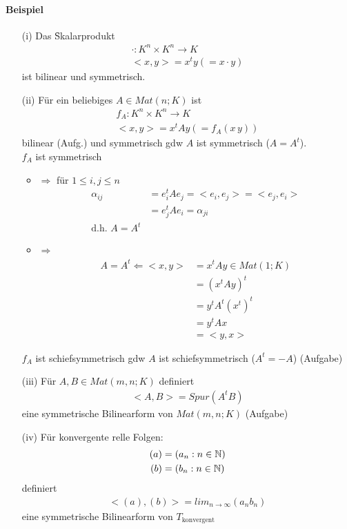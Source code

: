 \paragraph{Beispiel}
\begin{itemize}
\item[(i)] Das \f{Skalarprodukt}
\begin{align}
\cdot : K^{n} \times K^{n} \rightarrow K \\
<x, y> =x^t y (= x \cdot y)
\end{align}
ist bilinear und symmetrisch.

\item[(ii)] Für ein beliebiges $A \in Mat(n; K)$ ist
\begin{align}
f_A: K^n \times K^n \rightarrow K \\
<x, y> = x^t A y (=f_A(x\, y))
\end{align}
bilinear (Aufg.) und symmetrisch gdw $A$ ist symmetrisch ($A = A^t$). \\
$f_A$ ist symmetrisch
\begin{itemize}
\item $\Rightarrow$ für $1 \leq i, j \leq n$
\begin{align}
\alpha_{ij} &= e_{i}^{t} A e_{j} = <e_{i}, e_{j}> = <e_{j}, e_{i}> \\
&= e_{j}^{t} A e_{i} = \alpha_{ji} \\
\text{d.h. } A = A^t
\end{align}

\item $\Rightarrow$
\begin{align}
A = A^t \Leftarrow <x, y> &= x^t A y \in Mat(1; K) \\
&= (x^t A y)^t \\
&= y^t A^t (x^t)^t \\
&= y^t A x \\
&= <y, x>
\end{align}
\end{itemize}
$f_A$ ist schiefsymmetrisch gdw $A$ ist schiefsymmetrisch ($A^t = -A$) (Aufgabe)

\item[(iii)] Für $A, B \in Mat(m, n; K)$ definiert
\begin{align}
<A, B> = Spur(A^t B)
\end{align}
eine symmetrische Bilinearform von $Mat(m, n; K)$ (Aufgabe)

\item[(iv)] Für konvergente relle Folgen:
\begin{align}
(a) &= (a_n: n \in \mathbb{N}) \\
(b) &= (b_n: n \in \mathbb{N})
\end{align}
definiert
\begin{align}
<(a), (b)> = lim_{n \rightarrow \infty} (a_n b_n)
\end{align}
eine symmetrische Bilinearform von $T_{\text{konvergent}}$


\end{itemize}
